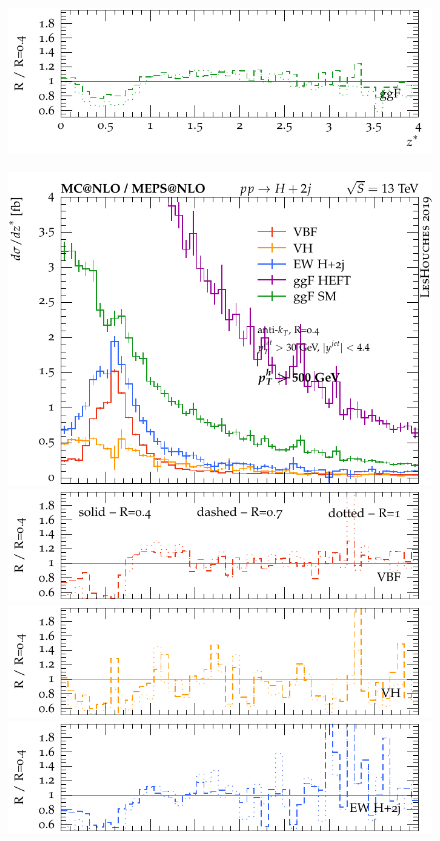 \documentclass[10pt,prd,fleqn,superscriptaddress,notitlepage,nofootinbib,preprintnumbers,nobalancelastpage]{revtex4-1}
\begin{document}
\begin{figure}[p]
\begin{minipage}{.295\textwidth}
    \includegraphics[width=\textwidth]{figures/channels/z_star_pth200_rGGH.pdf}
  \end{minipage}\hfill
  \begin{minipage}{.295\textwidth}
    \includegraphics[width=\textwidth]{figures/channels/z_star_pth500.pdf}
    \includegraphics[width=\textwidth]{figures/channels/z_star_pth500_rVBF.pdf}
    \includegraphics[width=\textwidth]{figures/channels/z_star_pth500_rVH.pdf}
    \includegraphics[width=\textwidth]{figures/channels/z_star_pth500_rHJJ.pdf}

\end{minipage}
\end{figure}
\end{document}
